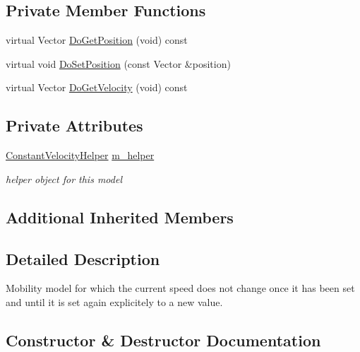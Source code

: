 \subsection*{Private Member Functions}
\begin{DoxyCompactItemize}
\item 
virtual Vector \hyperlink{classns3_1_1ConstantVelocityMobilityModel_a4a2d5c230c43d879ab68df4d6cf52ac0}{Do\+Get\+Position} (void) const 
\item 
virtual void \hyperlink{classns3_1_1ConstantVelocityMobilityModel_afbc65ba414f082ec9db7d2859f7730a9}{Do\+Set\+Position} (const Vector \&position)
\item 
virtual Vector \hyperlink{classns3_1_1ConstantVelocityMobilityModel_aee4cea128fa82f583786d47a90a1b224}{Do\+Get\+Velocity} (void) const 
\end{DoxyCompactItemize}
\subsection*{Private Attributes}
\begin{DoxyCompactItemize}
\item 
\hyperlink{classns3_1_1ConstantVelocityHelper}{Constant\+Velocity\+Helper} \hyperlink{classns3_1_1ConstantVelocityMobilityModel_a8743924c0254bfe69cd7a1d963d30f62}{m\+\_\+helper}
\begin{DoxyCompactList}\small\item\em helper object for this model \end{DoxyCompactList}\end{DoxyCompactItemize}
\subsection*{Additional Inherited Members}


\subsection{Detailed Description}
Mobility model for which the current speed does not change once it has been set and until it is set again explicitely to a new value. 

\subsection{Constructor \& Destructor Documentation}

